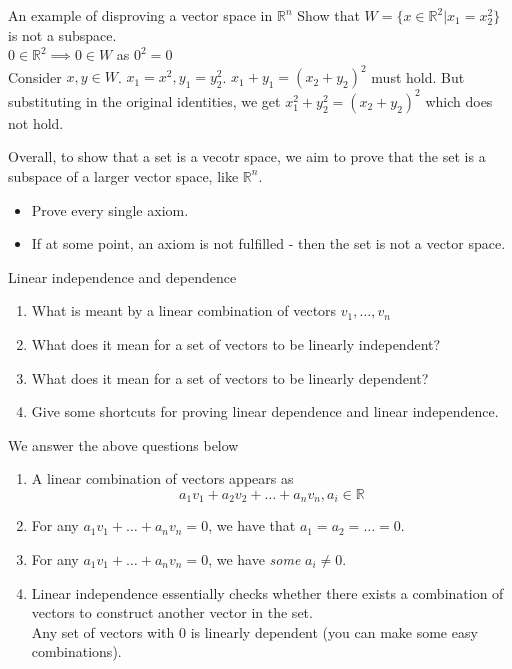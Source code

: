 \documentclass[journal, letterpaper]{IEEEtran}
\begin{document}
    \newpage 
    \begin{myboxg}{An example of disproving a vector space in $\mathbb{R}^n$}
        Show that $W = \{ x \in \mathbb{R}^2 | x_1 = x_2^2\}$ is not a subspace.
        \newline \\ 
        $0 \in \mathbb{R}^2 \implies 0 \in W$ as $0^2 = 0$
        \newline \\ 
        Consider $x, y \in W$. $x_1 = x^2, y_1 = y_2^2$. $x_1 + y_1 = (x_2 + y_2)^2$ must hold. But substituting in the original identities, we get $x_1^2 + y_2^2 = (x_2 + y_2)^2$ which does not hold.
    \end{myboxg}
    Overall, to show that a set is a vecotr space, we aim to prove that the set is a subspace of a larger vector space, like $\mathbb{R}^n$.
    \begin{itemize}
        \item Prove every single axiom.
        \item If at some point, an axiom is not fulfilled - then the set is not a vector space.
    \end{itemize}
    \begin{mybox}{Linear independence and dependence}
        \begin{enumerate}
            \item What is meant by a linear combination of vectors $v_1, \dots, v_n$
            \item What does it mean for a set of vectors to be linearly independent?
            \item What does it mean for a set of vectors to be linearly dependent?
            \item Give some shortcuts for proving linear dependence and linear independence.
        \end{enumerate}
    \end{mybox}
    We answer the above questions below
    \begin{enumerate}
        \item A linear combination of vectors appears as 
        $$ a_1v_1 + a_2v_2 + \dots + a_nv_n, a_i \in \mathbb{R}$$
        \item For any $a_1v_1 + \dots + a_nv_n = 0$, we have that $a_1 = a_2 = \dots = 0$.
        \item For any $a_1v_1 + \dots + a_nv_n = 0$, we have \textit{some} $a_i \ne 0$.
        \item Linear independence essentially checks whether there exists a combination of vectors to construct another vector in the set.
        \newline \\ 
        Any set of vectors with $0$ is linearly dependent (you can make some easy combinations).
    \end{enumerate}
\end{document}
